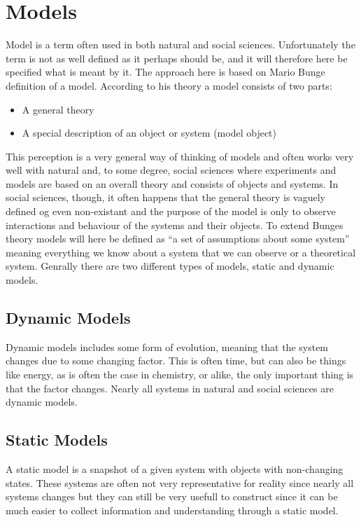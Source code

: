 \section{Models}
Model is a term often used in both natural and social sciences. Unfortunately the term is not as well defined as it perhaps should be, and it will therefore here be specified what is meant by it. The approach here is based on Mario Bunge definition of a model. According to his theory a model consists of two parts:
\begin{itemize}
\item A general theory
\item A special description of an object or system (model object)
\end{itemize}
This perception is a very general way of thinking of models and often works very well with natural and, to some degree, social  sciences where experiments and models are based on an overall theory and consists of objects and systems. In social sciences, though, it often happens that the general theory is vaguely defined og even non-existant and the purpose of the model is only to observe interactions and behaviour of the systems and their objects.
To extend Bunges theory models will here be defined as \enquote{a set of assumptions about some system} meaning everything we know about a system that we can observe or a theoretical system.
Genrally there are two different types of models, static and dynamic models.

\subsection{Dynamic Models}
Dynamic models includes some form of evolution, meaning that the system changes due to some changing factor. This is often time, but can also be things like energy, as is often the case in chemistry, or alike, the only important thing is that the factor changes. Nearly all systems in natural and social sciences are dynamic models.

\subsection{Static Models}
A static model is a snapshot of a given system with objects with non-changing states. These systems are often not very representative for reality since nearly all systems changes but they can still be very usefull to construct since it can be much easier to collect information and understanding through a static model. 

